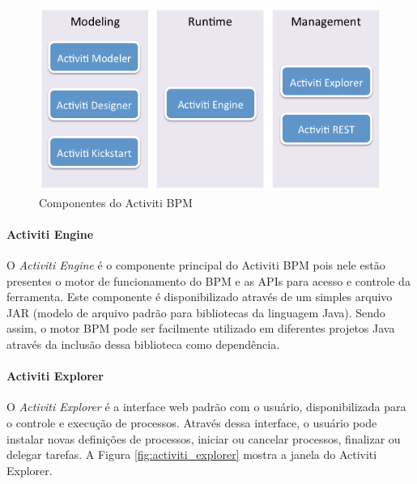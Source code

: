\begin{figure}[H]
\centering
\includegraphics[width=1\textwidth]{imagens/activiti_components_overview.png}
\caption{Componentes do Activiti BPM\cite{activiti_componentes}}
\label{fig:activiti_componentes}
\end{figure}

\paragraph{Activiti Engine}\label{sec:automatizacao_processos-gestao_processos_activiti_engine}

O \textit{Activiti Engine} é o componente principal do Activiti BPM pois nele estão presentes o motor de funcionamento do BPM e as APIs para acesso e controle da ferramenta. Este componente é disponibilizado através de um simples arquivo JAR\cite{jar} (modelo de arquivo padrão para bibliotecas da linguagem Java). Sendo assim, o motor BPM pode ser facilmente utilizado em diferentes projetos Java através da inclusão dessa biblioteca como dependência.

\paragraph{Activiti Explorer}\label{sec:automatizacao_processos-gestao_processos_activiti_explorer}

O \textit{Activiti Explorer} é a interface web padrão com o usuário, disponibilizada para o controle e execução de processos. Através dessa interface, o usuário pode instalar novas definições de processos, iniciar ou cancelar processos, finalizar ou delegar tarefas. A Figura \ref{fig:activiti_explorer} mostra a janela do Activiti Explorer.

